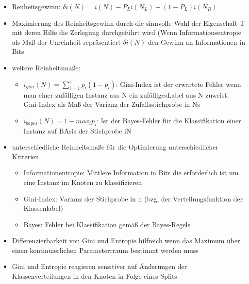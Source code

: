 \documentclass{article} %
\begin{document}
\begin{itemize}
		\item Renheitsgewinn: $\delta i(N) = i(N)-P_Li(N_L)-(1-P_L)i(N_R)$
		\item Maximierung des Reinheitsgewinn durch die sinnvolle Wahl der Eigenschaft T mit deren Hilfe die Zerlegung durchgeführt wird (Wenn Informationsentropie als Maß der Unreinheit repräsentiert $\delta i(N)$ den Gewinn an Informationen in Bits
		\item weitere Reinheitsmaße:
		\begin{itemize}
			\item $i_{gini}(N) = \sum_{i=1}^{c}p_i(1-p_i)$: Gini-Index ist der erwartete Fehler wenn man einer zufälligen Instanz aus N ein zufälligesLabel aus N zuweist. Gini-Index als Maß der Varianz der Zufallsstichprobe in Ns
			\item $i_{bayes}(N) = 1 - max_i p_i$: Ist der Bayes-Fehler für die Klassifikation einer Instanz auf BAsis der Stichprobe iN
		\end{itemize}
		\item unterschiedliche Reinheitsmaße für die Optimierung unterschiedlicher Kriterien
		\begin{itemize}
			\item Informationentropie: Mittlere Information in Bits die erforderlich ist um eine Instanz im Knoten zu klassifizieren
			\item Gini-Index: Varianz der Stichprobe in n (bzgl der Verteilungsfunktion der Klassenlabel)
			\item Bayes: Fehler bei Klassifikation gemäß der Bayes-Regels
		\end{itemize}
		\item Differenzierbarkeit von Gini und Entropie hilfreich wenn das Maximum über einen kontinuierlichen Parameterrraum bestimmt werden muss
		\item Gini und Entropie reagieren sensitiver auf Änderungen der Klassenverteilungen in den Knoten in Folge eines Splits
	\end{itemize}
\end{document}
